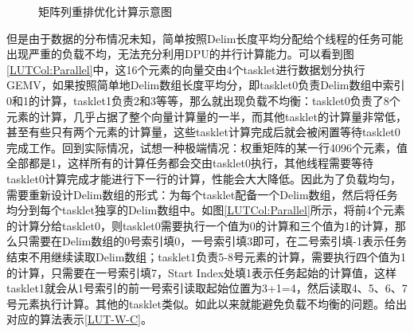 \begin{figure}[htbp!]
	\centering
	\label{LUTCol}
	\caption{矩阵列重排优化计算示意图}
\end{figure}

但是由于数据的分布情况未知，简单按照Delim长度平均分配给个线程的任务可能出现严重的负载不均，无法充分利用DPU的并行计算能力。可以看到图\ref{LUTCol:Parallel}中，这16个元素的向量交由4个tasklet进行数据划分执行GEMV，如果按照简单地Delim数组长度平均分，即tasklet0负责Delim数组中索引0和1的计算，tasklet1负责2和3等等，那么就出现负载不均衡：tasklet0负责了8个元素的计算，几乎占据了整个向量计算量的一半，而其他tasklet的计算量非常低，甚至有些只有两个元素的计算量，这些tasklet计算完成后就会被闲置等待tasklet0完成工作。回到实际情况，试想一种极端情况：权重矩阵的某一行4096个元素，值全部都是1，这样所有的计算任务都会交由tasklet0执行，其他线程需要等待tasklet0计算完成才能进行下一行的计算，性能会大大降低。因此为了负载均匀，需要重新设计Delim数组的形式：为每个tasklet配备一个Delim数组，然后将任务均分到每个tasklet独享的Delim数组中。如图\ref{LUTCol:Parallel}所示，将前4个元素的计算分给tasklet0，则tasklet0需要执行一个值为0的计算和三个值为1的计算，那么只需要在Delim数组的0号索引填0，一号索引填3即可，在二号索引填-1表示任务结束不用继续读取Delim数组；tasklet1负责5-8号元素的计算，需要执行四个值为1的计算，只需要在一号索引填7，Start Index处填1表示任务起始的计算值，这样tasklet1就会从1号索引的前一号索引读取起始位置为3+1=4，然后读取4、5、6、7号元素执行计算。其他的tasklet类似。如此以来就能避免负载不均衡的问题。给出对应的算法表示\ref{LUT-W-C}。

